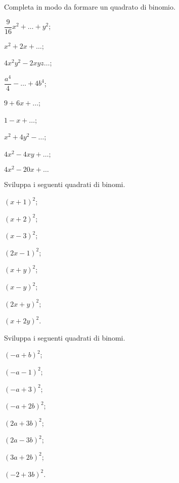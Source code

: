 \begin{esercizio}
 \label{ese:12.3}
Completa in modo da formare un quadrato di binomio.
\begin{multicols}{3}
\begin{enumeratea}
\spazielenx
 \item $\dfrac{9}{16}x^{2}+\ldots +y^{2}$;
 \item $x^{2} + 2x + \ldots $;
 \item $4x^{2}y^{2} - 2xyz \ldots $;
 \item $\dfrac{a^{4}}{4}-\ldots+4b^{4}$;
 \item $9+6x+ \ldots $;
 \item $1-x+ \ldots $;
 \item $x^{2}+4y^{2}-\ldots $;
 \item $4x^{2}-4{xy}+ \ldots $;
 \item $4x^{2}-20x+\ldots $
\end{enumeratea}
\end{multicols}
\end{esercizio}


\begin{esercizio}
 \label{ese:12.4}
Sviluppa i seguenti quadrati di binomi.
\begin{multicols}{4}
\begin{enumeratea}
 \item $\left(x+1\right)^{2}$;
 \item $\left(x+2\right)^{2}$;
 \item $\left(x-3\right)^{2}$;
 \item $\left(2x-1\right)^{2}$;
 \item $\left(x+y\right)^{2}$;
 \item $\left(x-y\right)^{2}$;
 \item $\left(2x+y\right)^{2}$;
 \item $\left(x+2y\right)^{2}$.
\end{enumeratea}
\end{multicols}
\end{esercizio}

\begin{esercizio}
 \label{ese:12.5}
Sviluppa i seguenti quadrati di binomi.
\begin{multicols}{4}
\begin{enumeratea}
 \item $\left(-a+b\right)^{2}$;
 \item $\left(-a-1\right)^{2}$;
 \item $\left(-a+3\right)^{2}$;
 \item $\left(-a+2b\right)^{2}$;
 \item $\left(2a+3b\right)^{2}$;
 \item $\left(2a-3b\right)^{2}$;
 \item $\left(3a+2b\right)^{2}$;
 \item $\left(-2+3b\right)^{2}$.
\end{enumeratea}
\end{multicols}
\end{esercizio}

